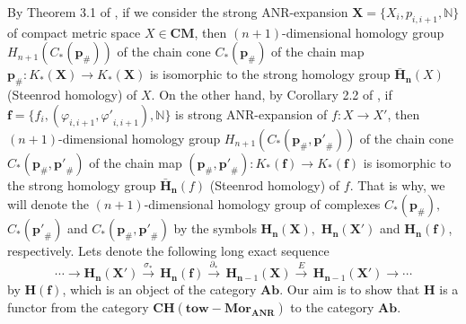 \documentclass[10pt]{article}
\theoremstyle{definition}
\begin{document}
By Theorem 3.1 of \cite{1901}, if we consider the strong  ANR-expansion $\mathbf{X}=\{X_i,p_{i,i+1}, \mathbb{N} \}$ of compact metric space $X\in \mathbf{CM}$, then $( n+1 )$-dimensional homology group   ${{H}_{n+1}}( {{C}_{*}}( {{\mathbf{p}}_{\#}} ) )$ of the chain cone ${{C}_{*}}( {{\mathbf{p}}_{\#}} )$ of the chain map ${{\mathbf{p}}_{\#}}:{{K}_{*}}( \mathbf{X} )\to {{K}_{*}}( \mathbf{X} )$  is isomorphic to the strong homology group ${{\mathbf{\bar{H}}}_{\mathbf{n}}}( X )$ (Steenrod homology) of  $X$. On the other hand, by Corollary 2.2 of \cite{1902}, if $\mathbf{f}=\{ f_i,( \varphi_{i,i+1},{\varphi '}_{i,i+1} ), \mathbb{N} \}$ is strong ANR-expansion of $ f:X \to X'$, then $( n+1 )$-dimensional homology group   ${{H}_{n+1}}( {{C}_{*}}( {{\mathbf{p}}_{\#}},{{\mathbf{p'}}_{\#}} ) )$ of the chain cone ${{C}_{*}}( {{\mathbf{p}}_{\#}},{{\mathbf{p'}}_{\#}} )$ of the chain map $({{\mathbf{p}}_{\#}},{{\mathbf{p'}}_{\#}}):{{K}_{*}}( \mathbf{f} )\to {{K}_{*}}( \mathbf{f} )$  is isomorphic to the strong homology group ${{\mathbf{\bar{H}}}_{\mathbf{n}}}( f )$ (Steenrod homology) of  $f$. That is why, we will denote   the $( n+1 )$-dimensional homology group of complexes ${{C}_{*}}( {{\mathbf{p}}_{\#}} ),$ ${{C}_{*}}( \mathbf{p'}_{\#})$ and $ {{C}_{*}}( {{\mathbf{p}}_{\#}},\mathbf{p'}_{\#})$ by the symbols  ${{\mathbf{{H}}}_{\mathbf{n}}}( \mathbf {X} ),$ ${{\mathbf{{H}}}_{\mathbf{n}}}( {{ \mathbf{X}}'} )$ and ${{\mathbf{{H}}}_{\mathbf{n}}}( \mathbf{f} )$, respectively. Lets denote  the following long exact  sequence
$$
\cdots \to {{\mathbf{{H}}}_{\mathbf{n}}}( { \mathbf{X'}} )\overset{{{\sigma }_{*}}}{\mathop{\to }}\,{{\mathbf{{H}}}_{\mathbf{n}}}( \mathbf{f} )\overset{{{\partial }_{*}}}{\mathop{\to }}\,{{\mathbf{{H}}}_{\mathbf{n}-1}}( \mathbf{X} )\overset{E}{\mathop{\to }}\,{{\mathbf{{H}}}_{\mathbf{n}-1}}( { \mathbf{X'}} )\to \cdots
$$
by  ${\mathbf{{H}}}( \mathbf{f} )$, which is  an object of the category $\mathbf{Ab}$. Our aim is to show that $\mathbf{{H}}$ is a functor from the category $\mathbf{CH}( \mathbf{tow}-\mathbf{Mo}{{\mathbf{r}}_{\mathbf{ANR}}} )$ to the category $\mathbf{Ab}$. 
\end{document}
